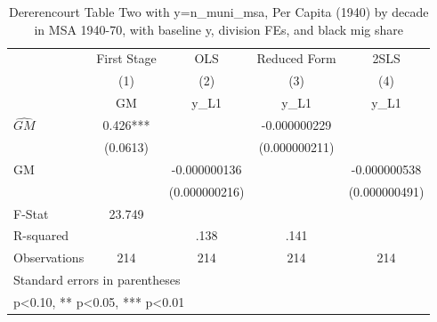 \begin{table}[htbp]\centering
\def\sym#1{\ifmmode^{#1}\else\(^{#1}\)\fi}
\caption{Dererencourt Table Two with y=n\_muni\_msa, Per Capita (1940) by decade in MSA 1940-70, with baseline y, division FEs, and black mig share}
\begin{tabular}{l*{4}{c}}
\toprule
                    & First Stage   &         OLS   &Reduced Form   &        2SLS   \\
                    &\multicolumn{1}{c}{(1)}&\multicolumn{1}{c}{(2)}&\multicolumn{1}{c}{(3)}&\multicolumn{1}{c}{(4)}\\
                    &\multicolumn{1}{c}{GM}&\multicolumn{1}{c}{y\_L1}&\multicolumn{1}{c}{y\_L1}&\multicolumn{1}{c}{y\_L1}\\
\midrule
$\hat{GM}$          &       0.426***&               &-0.000000229   &               \\
                    &    (0.0613)   &               &(0.000000211)   &               \\
\addlinespace
GM                  &               &-0.000000136   &               &-0.000000538   \\
                    &               &(0.000000216)   &               &(0.000000491)   \\
\midrule
F-Stat              &      23.749   &               &               &               \\
R-squared           &               &        .138   &        .141   &               \\
Observations        &         214   &         214   &         214   &         214   \\
\bottomrule
\multicolumn{5}{l}{\footnotesize Standard errors in parentheses}\\
\multicolumn{5}{l}{\footnotesize * p<0.10, ** p<0.05, *** p<0.01}\\
\end{tabular}
\end{table}
